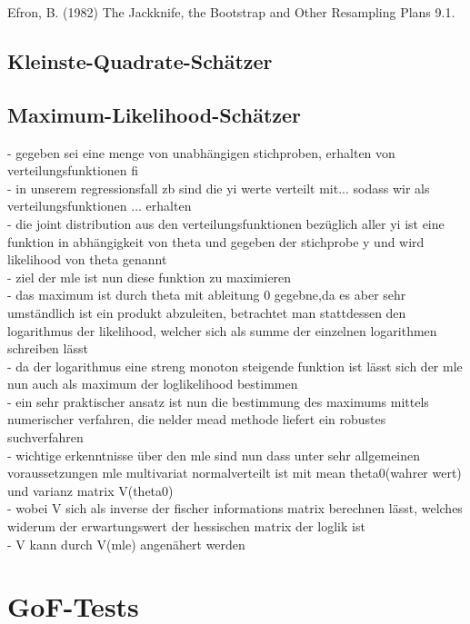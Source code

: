 Efron, B. (1982) The Jackknife, the Bootstrap and Other Resampling Plans 9.1.


\subsection{Kleinste-Quadrate-Schätzer}
\subsection{Maximum-Likelihood-Schätzer}



- gegeben sei eine menge von unabhängigen stichproben, erhalten von verteilungsfunktionen fi\\
- in unserem regressionsfall zb sind die yi werte verteilt mit... sodass wir als verteilungsfunktionen ... erhalten\\
- die joint distribution aus den verteilungsfunktionen bezüglich aller yi ist eine funktion in abhängigkeit von theta und gegeben der stichprobe y und wird likelihood von theta genannt\\
- ziel der mle ist nun diese funktion zu maximieren\\
- das maximum ist durch theta mit ableitung 0 gegebne,da es aber sehr umständlich ist ein produkt abzuleiten, betrachtet man stattdessen den logarithmus der likelihood, welcher sich als summe der einzelnen logarithmen schreiben lässt\\
- da der logarithmus eine streng monoton steigende funktion ist lässt sich der mle nun auch als maximum der loglikelihood bestimmen\\
- ein sehr praktischer ansatz ist nun die bestimmung des maximums mittels numerischer verfahren, die nelder mead methode liefert ein robustes suchverfahren\\
- wichtige erkenntnisse über den mle sind nun dass unter sehr allgemeinen voraussetzungen mle multivariat normalverteilt ist mit mean theta0(wahrer wert) und varianz matrix V(theta0)\\
- wobei V sich als inverse der fischer informations matrix berechnen lässt, welches widerum der erwartungswert der hessischen matrix der loglik ist\\
- V kann durch V(mle) angenähert werden\\


\section{GoF-Tests}
